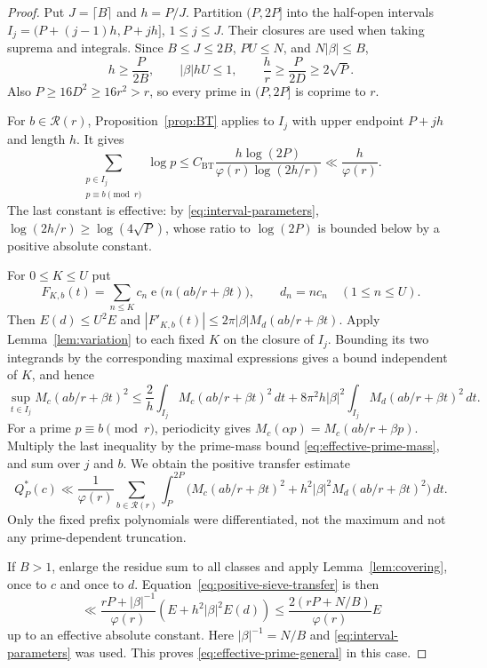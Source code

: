 \documentclass[11pt]{amsart}
\numberwithin{equation}{section}
\numberwithin{figure}{section}
\theoremstyle{definition}
\newcommand{\e}{\operatorname{e}}
\begin{document}
\begin{proof}
Put $J=\lceil B\rceil$ and $h=P/J$. Partition $(P,2P]$ into the
half-open intervals
$I_j=(P+(j-1)h,P+jh]$, $1\le j\le J$.
Their closures are used when taking suprema and integrals. Since
$B\le J\le2B$, $PU\le N$, and $N|\beta|\le B$,
\begin{equation}\label{eq:interval-parameters}
 h\ge\frac{P}{2B},\qquad |\beta|hU\le1,\qquad
 \frac h r\ge\frac{P}{2D}\ge2\sqrt P.
\end{equation}
Also $P\ge16D^2\ge16r^2>r$, so every prime in $(P,2P]$ is
coprime to $r$.

For $b\in\mathcal R(r)$, Proposition~\ref{prop:BT} applies to $I_j$
with upper endpoint $P+jh$ and length $h$. It gives
\begin{equation}\label{eq:effective-prime-mass}
 \sum_{\substack{p\in I_j\\p\equiv b\pmod r}}\log p
 \le C_\mathrm{BT}\frac{h\log(2P)}{\varphi(r)\log(2h/r)}
 \ll\frac h{\varphi(r)}.
\end{equation}
The last constant is effective: by \eqref{eq:interval-parameters},
$\log(2h/r)\ge\log(4\sqrt P)$, whose ratio to $\log(2P)$ is bounded
below by a positive absolute constant.

For $0\le K\le U$ put
\[
 F_{K,b}(t)=\sum_{n\le K}c_n\e\bigl(n(ab/r+\beta t)\bigr),
 \qquad d_n=nc_n\quad(1\le n\le U).
\]
Then $E(d)\le U^2E$ and
$|F'_{K,b}(t)|\le2\pi|\beta|M_d(ab/r+\beta t)$.
Apply Lemma~\ref{lem:variation} to each fixed $K$ on the closure of
$I_j$. Bounding its two integrands by the corresponding maximal
expressions gives a bound independent of $K$, and hence
\[
 \sup_{t\in I_j}M_c(ab/r+\beta t)^2
 \le\frac2h\int_{I_j}M_c(ab/r+\beta t)^2\,dt
 +8\pi^2h|\beta|^2\int_{I_j}M_d(ab/r+\beta t)^2\,dt.
\]
For a prime $p\equiv b\pmod r$, periodicity gives
$M_c(\alpha p)=M_c(ab/r+\beta p)$.
Multiply the last inequality by the prime-mass bound
\eqref{eq:effective-prime-mass}, and sum over $j$ and $b$.
We obtain the positive transfer estimate
\begin{equation}\label{eq:positive-sieve-transfer}
 Q_P^*(c)\ll\frac1{\varphi(r)}\sum_{b\in\mathcal R(r)}
 \int_P^{2P}\big(M_c(ab/r+\beta t)^2
   +h^2|\beta|^2 M_d(ab/r+\beta t)^2\big)\,dt.
\end{equation}
Only the fixed prefix polynomials were differentiated, not the maximum
and not any prime-dependent truncation.

If $B>1$, enlarge the residue sum to all classes and apply
Lemma~\ref{lem:covering}, once to $c$ and once to $d$.
Equation~\eqref{eq:positive-sieve-transfer} is then
\[
 \ll\frac{rP+|\beta|^{-1}}{\varphi(r)}
                  (E+h^2|\beta|^2E(d))
 \le\frac{2(rP+N/B)}{\varphi(r)}E
\]
up to an effective absolute constant. Here
$|\beta|^{-1}=N/B$ and \eqref{eq:interval-parameters} was used.
This proves \eqref{eq:effective-prime-general} in this case.


\end{proof}
\end{document}
